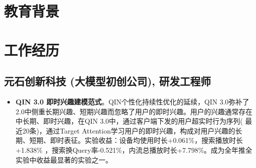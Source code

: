 \documentclass[11pt,a4paper]{moderncv}
\begin{document}
\maketitle
\vspace{-3em}      %

\section{\textbf{教育背景}}

\section{\textbf{工作经历}}

\subsection{元石创新科技 (大模型初创公司), 研发工程师}
{
\begin{itemize}
\item \textbf{QIN 3.0 即时兴趣建模范式}。QIN个性化持续性优化的延续，QIN 3.0弥补了2.0中侧重长期兴趣、短期兴趣而忽略了用户的即时兴趣。用户的兴趣通常存在中长期、即时兴趣，在QIN 3.0中，通过客户端下发的用户超实时行为序列( 最近20条)，通过Target Attention学习用户的即时兴趣，构成对用户兴趣的长期、短期、即时表征。实验收益：设备均使用时长+0.061\%，搜索播放时长+1.838\% ，搜索换Query率-0.521\%，内流总播放时长+7.798\%。成为全年推全实验中收益最显著的实验之一。
\end{itemize}
}
\end{document}
